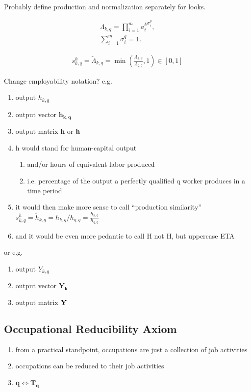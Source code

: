\documentclass{elsarticle} %
\begin{document}
Probably define production and normalization separately for looks.

\begin{gather*}
    \Lambda_{k,q} = 
        \prod_{i=1}^{m}{
        {a_{i}^{k}} ^ {
            \sigma_{i}^{q}
        }
    }
    ,\\
    \sum_{i=1}^{m}{
        \sigma_{i}^{q}
    } = 1
    .
\end{gather*}

\begin{gather*}
    s_{k,q}^{h} = 
    \tilde{\Lambda}_{k,q} = 
    \min\left(
        \frac{\Lambda_{k,q}}{\Lambda_{q,q}},
        1
    \right)
    \in [0,1]
\end{gather*}

Change employability notation?
e.g.
\begin{enumerate}
    \item output $h_{k,q}$
    \item output vector $\boldsymbol{h_{k,q}}$
    \item output matrix $\boldsymbol{h}$ or $\vb{h}$
    \item h would stand for human-capital output
    \begin{enumerate}
        \item and/or hours of equivalent labor produced
        \item i.e. percentage of the output a perfectly qualified q worker produces in a time period
    \end{enumerate}
    \item it would then make more sense to call ``production similarity'' $s_{k,q}^{h} = \tilde{h}_{k,q} = h_{k,q} / h_{q,q} = 
    \frac{h_{k,q}}{h_{q,q}}$
    \item and it would be even more pedantic to call H not H, but uppercase ETA
\end{enumerate}

or e.g.
\begin{enumerate}
    \item output $Y_{k,q}$
    \item output vector $\boldsymbol{Y_{k}}$
    \item output matrix $\vb{Y}$
\end{enumerate}

\subsection{Occupational Reducibility Axiom}
\begin{enumerate}
    \item from a practical standpoint, occupations are just a collection of job
          activities
    \item occupations can be reduced to their job activities
    \item $\boldsymbol{q} \iff \boldsymbol{T_q}$
\end{enumerate}
\end{document}
